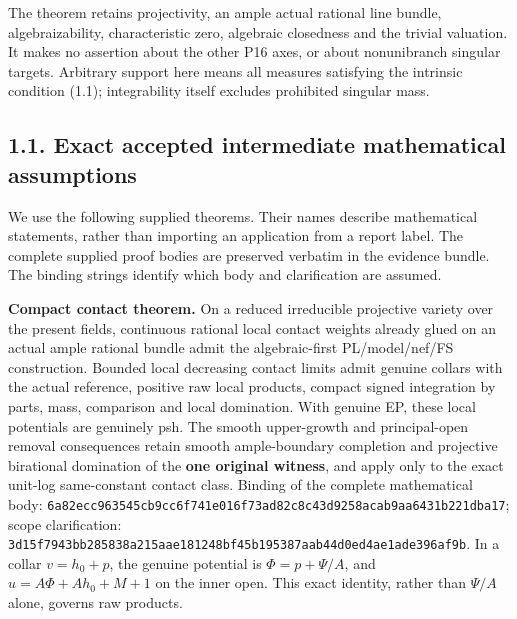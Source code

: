 \documentclass[
  10pt,
]{article}
\begin{document}
The theorem retains projectivity, an ample actual rational line bundle,
algebraizability, characteristic zero, algebraic closedness and the
trivial valuation. It makes no assertion about the other P16 axes, or
about nonunibranch singular targets. Arbitrary support here means all
measures satisfying the intrinsic condition (1.1); integrability itself
excludes prohibited singular mass.

\subsection{1.1. Exact accepted intermediate mathematical
assumptions}\label{exact-accepted-intermediate-mathematical-assumptions}

We use the following supplied theorems. Their names describe
mathematical statements, rather than importing an application from a
report label. The complete supplied proof bodies are preserved verbatim
in the evidence bundle. The binding strings identify which body and
clarification are assumed.

\textbf{Compact contact theorem.} On a reduced irreducible projective
variety over the present fields, continuous rational local contact
weights already glued on an actual ample rational bundle admit the
algebraic-first PL/model/nef/FS construction. Bounded local decreasing
contact limits admit genuine collars with the actual reference, positive
raw local products, compact signed integration by parts, mass,
comparison and local domination. With genuine EP, these local potentials
are genuinely psh. The smooth upper-growth and principal-open removal
consequences retain smooth ample-boundary completion and projective
birational domination of the \textbf{one original witness}, and apply
only to the exact unit-log same-constant contact class. Binding of the
complete mathematical body:
\texttt{6a82ecc9\allowbreak{}63545cb9\allowbreak{}cc6f741e\allowbreak{}016f73ad\allowbreak{}82c8c43d\allowbreak{}9258acab\allowbreak{}9aa6431b\allowbreak{}221dba17};
scope clarification:
\texttt{3d15f794\allowbreak{}3bb28583\allowbreak{}8a215aae\allowbreak{}181248bf\allowbreak{}45b19538\allowbreak{}7aab44d0\allowbreak{}ed4ae1ad\allowbreak{}e396af9b}.
In a collar \(v=h_0+p\), the genuine potential is \(\Phi=p+\Psi/A\), and
\(u=A\Phi+Ah_0+M+1\) on the inner open. This exact identity, rather than
\(\Psi/A\) alone, governs raw products.
\end{document}
